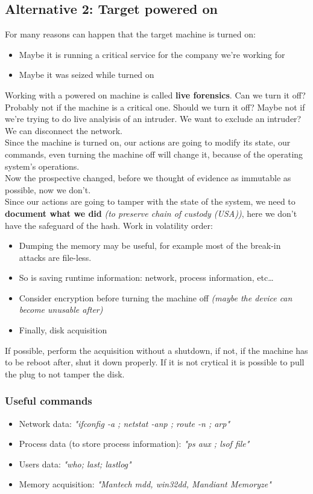     \subsection{Alternative 2: Target powered on}
        For many reasons can happen that the target machine is turned on:
        \begin{itemize}
            \item Maybe it is running a critical service for the company we're working for
            \item Maybe it was seized while turned on
        \end{itemize}
        Working with a powered on machine is called \textbf{live forensics}.
        Can we turn it off? Probably not if the machine is a critical one. Should we turn it off? Maybe not if we're trying to do live analyisis of an intruder. We want to exclude an intruder? We can disconnect the network.\\
        Since the machine is turned on, our actions are going to modify its state, our commands, even turning the machine off will change it, because of the operating system's operations.\\
        Now the prospective changed, before we thought of evidence as immutable as possible, now we don't.\\
        Since our actions are going to tamper with the state of the system, we need to \textbf{document what we did} \textit{(to preserve chain of custody (USA))}, here we don't have the safeguard of the hash.
        Work in volatility order:
        \begin{itemize}
            \item Dumping the memory may be useful, for example most of the break-in attacks are file-less.
            \item So is saving runtime information: network, process information, etc\dots
            \item Consider encryption before turning the machine off \textit{(maybe the device can become unusable after)}
            \item Finally, disk acquisition
        \end{itemize}
        If possible, perform the acquisition without a shutdown, if not, if the machine has to be reboot after, shut it down properly. If it is not crytical it is possible to pull the plug to not tamper the disk.
        \subsubsection*{Useful commands}
        \begin{itemize}
            \item Network data: \textit{"ifconfig -a ; netstat -anp ; route -n ; arp"}
            \item Process data (to store process information): \textit{"ps aux ; lsof file"}
            \item Users data: \textit{"who; last; lastlog"}
            \item Memory acquisition: \textit{"Mantech mdd, win32dd, Mandiant Memoryze"}
        \end{itemize}
